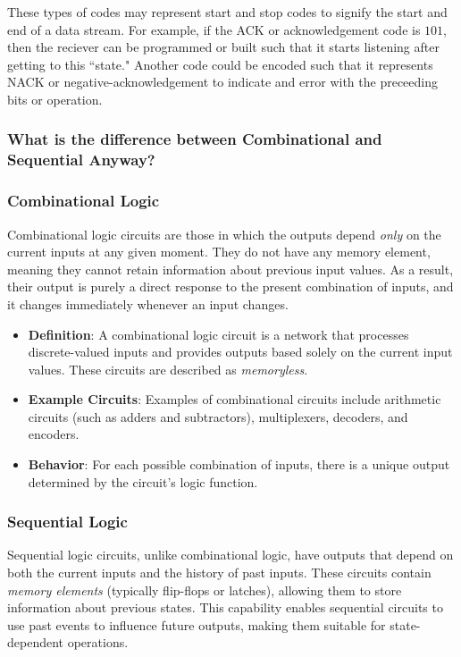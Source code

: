 \documentclass[12pt]{article}
\begin{document}
These types of codes may represent start and stop codes to signify the start and
end of a data stream. For example, if the ACK or acknowledgement code is
\(101\), then the reciever can be programmed or built such that it starts
listening after getting to this ``state." Another code could be encoded such
that it represents NACK or negative-acknowledgement to indicate and error with
the preceeding bits or operation.

\subsubsection*{What is the difference between Combinational and Sequential
	Anyway?}
\hline
\vspace{5mm}
\subsubsection*{Combinational Logic}
Combinational logic circuits are those in which the outputs depend \textit{only} on the current inputs at any given moment. They do not have any memory element, meaning they cannot retain information about previous input values. As a result, their output is purely a direct response to the present combination of inputs, and it changes immediately whenever an input changes.

\begin{itemize}
	\item \textbf{Definition}: A combinational logic circuit is a network that processes discrete-valued inputs and provides outputs based solely on the current input values. These circuits are described as \textit{memoryless}.
	\item \textbf{Example Circuits}: Examples of combinational circuits include arithmetic circuits (such as adders and subtractors), multiplexers, decoders, and encoders.
	\item \textbf{Behavior}: For each possible combination of inputs, there is a unique output determined by the circuit’s logic function.
\end{itemize}

\hline

\subsubsection*{Sequential Logic}
Sequential logic circuits, unlike combinational logic, have outputs that depend on both the current inputs and the history of past inputs. These circuits contain \textit{memory elements} (typically flip-flops or latches), allowing them to store information about previous states. This capability enables sequential circuits to use past events to influence future outputs, making them suitable for state-dependent operations.
\end{document}
